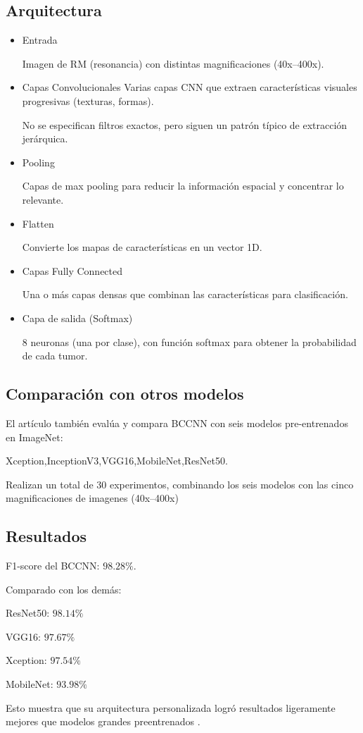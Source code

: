 \subsection{Arquitectura}
\begin{itemize}
    \item Entrada

Imagen de RM (resonancia) con distintas magnificaciones (40x–400x).

\item Capas Convolucionales 
Varias capas CNN que extraen características visuales progresivas (texturas, formas).

No se especifican filtros exactos, pero siguen un patrón típico de extracción jerárquica.

\item Pooling

Capas de max pooling para reducir la información espacial y concentrar lo relevante.

\item Flatten

Convierte los mapas de características en un vector 1D.

\item Capas Fully Connected

Una o más capas densas que combinan las características para clasificación.

\item Capa de salida (Softmax)

8 neuronas (una por clase), con función softmax para obtener la probabilidad de cada tumor.


    
\end{itemize}
\subsection{Comparación con otros modelos}
El artículo también evalúa y compara BCCNN con seis modelos pre-entrenados en ImageNet:

Xception,InceptionV3,VGG16,MobileNet,ResNet50.

Realizan un total de 30 experimentos, combinando los seis modelos con las cinco magnificaciones de imagenes (40x–400x)
\subsection{Resultados}
F1-score del BCCNN: $98.28\%.$

Comparado con los demás:

ResNet50: $98.14\%$

VGG16: $97.67\%$

Xception: $97.54\%$

MobileNet: $93.98\%$

Esto muestra que su arquitectura personalizada logró resultados ligeramente mejores que modelos grandes preentrenados .

